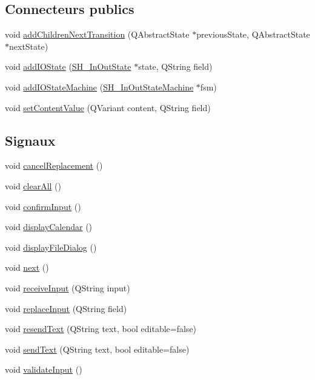 \subsection*{Connecteurs publics}
\begin{DoxyCompactItemize}
\item 
void \hyperlink{classSH__InOutStateMachine_a689e5513ef6ef3fc1598efacd413372e}{add\-Children\-Next\-Transition} (Q\-Abstract\-State $\ast$previous\-State, Q\-Abstract\-State $\ast$next\-State)
\item 
void \hyperlink{classSH__InOutStateMachine_ad6b778d052f741daee720c047059ce0e}{add\-I\-O\-State} (\hyperlink{classSH__InOutState}{S\-H\-\_\-\-In\-Out\-State} $\ast$state, Q\-String field)
\item 
void \hyperlink{classSH__InOutStateMachine_a56954869252c7f1980abf37df9919b5e}{add\-I\-O\-State\-Machine} (\hyperlink{classSH__InOutStateMachine}{S\-H\-\_\-\-In\-Out\-State\-Machine} $\ast$fsm)
\item 
void \hyperlink{classSH__InOutStateMachine_aa2766b7a7ba39c35a10df7fc0c151b4f}{set\-Content\-Value} (Q\-Variant content, Q\-String field)
\end{DoxyCompactItemize}
\subsection*{Signaux}
\begin{DoxyCompactItemize}
\item 
void \hyperlink{classSH__InOutStateMachine_a67ce246a765ad91fef76f70ece12213f}{cancel\-Replacement} ()
\item 
void \hyperlink{classSH__InOutStateMachine_ad722deb53285919796b04db5af6e51b4}{clear\-All} ()
\item 
void \hyperlink{classSH__InOutStateMachine_a0fb4c4d63ccb19df48f1e060d02d8ae3}{confirm\-Input} ()
\item 
void \hyperlink{classSH__InOutStateMachine_a0d241868828cbf9798233a8c74c69851}{display\-Calendar} ()
\item 
void \hyperlink{classSH__InOutStateMachine_aeddfbc098f5ee8ac05eadbaf37803fb1}{display\-File\-Dialog} ()
\item 
void \hyperlink{classSH__InOutStateMachine_aa9ee51efe0e17dcf5366c8a97b523892}{next} ()
\item 
void \hyperlink{classSH__InOutStateMachine_ab224e4a6ab99c15770bc63e1b8fdb771}{receive\-Input} (Q\-String input)
\item 
void \hyperlink{classSH__InOutStateMachine_af5f82970faef3bca48a147863dba2ee1}{replace\-Input} (Q\-String field)
\item 
void \hyperlink{classSH__InOutStateMachine_a526822c66b46aa0cd81ba4473fa5573f}{resend\-Text} (Q\-String text, bool editable=false)
\item 
void \hyperlink{classSH__InOutStateMachine_ae2cbbe3cd207158668dcb4838938c7ad}{send\-Text} (Q\-String text, bool editable=false)
\item 
void \hyperlink{classSH__InOutStateMachine_a5a5804bd32a04d25926f6e323b906887}{validate\-Input} ()
\end{DoxyCompactItemize}
